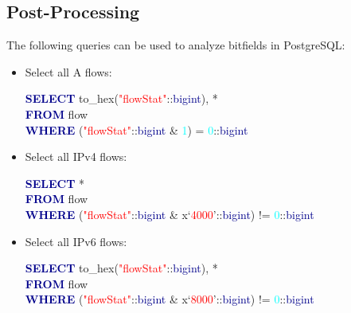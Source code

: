 \documentclass[documentation]{subfiles}
\begin{document}
\subsection{Post-Processing}
The following queries can be used to analyze bitfields in PostgreSQL:
\begin{itemize}
    \item Select all A flows:\\
        \begin{ttfamily}
            \textcolor{darkblue}{\bf SELECT} to\_hex(\textcolor{red}{"flowStat"}::\textcolor{darkblue}{bigint}), *\\
            \textcolor{darkblue}{\bf FROM} flow\\
            \textcolor{darkblue}{\bf WHERE} (\textcolor{red}{"flowStat"}::\textcolor{darkblue}{bigint} \& \textcolor{cyan}{1}) = \textcolor{cyan}{0}::\textcolor{darkblue}{bigint}
        \end{ttfamily}
    \item Select all IPv4 flows:\\
        \begin{ttfamily}
            \textcolor{darkblue}{\bf SELECT} *\\
            \textcolor{darkblue}{\bf FROM} flow\\
            \textcolor{darkblue}{\bf WHERE} (\textcolor{red}{"flowStat"}::\textcolor{darkblue}{bigint} \& x`\textcolor{red}{4000}'::\textcolor{darkblue}{bigint}) != \textcolor{cyan}{0}::\textcolor{darkblue}{bigint}
        \end{ttfamily}
    \item Select all IPv6 flows:\\
        \begin{ttfamily}
            \textcolor{darkblue}{\bf SELECT} to\_hex(\textcolor{red}{"flowStat"}::\textcolor{darkblue}{bigint}), *\\
            \textcolor{darkblue}{\bf FROM} flow\\
            \textcolor{darkblue}{\bf WHERE} (\textcolor{red}{"flowStat"}::\textcolor{darkblue}{bigint} \& x`\textcolor{red}{8000}'::\textcolor{darkblue}{bigint}) != \textcolor{cyan}{0}::\textcolor{darkblue}{bigint}
        \end{ttfamily}
\end{itemize}
\end{document}
